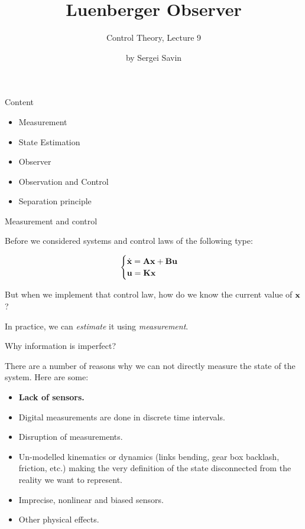 \documentclass{beamer}
\title{Luenberger Observer}
\subtitle{Control Theory, Lecture 9}
\author{by Sergei Savin}
\date{\mydate}
\begin{document}
\maketitle



\begin{frame}{Content}
\begin{itemize}
\item Measurement
\item State Estimation
\item Observer
\item Observation and Control
\item Separation principle
\end{itemize}
\end{frame}




\begin{frame}{Measurement and control}
\begin{flushleft}

Before we considered systems and control laws of the following type:

\begin{equation}
\begin{cases}
\dot {\mathbf{x}} = \mathbf{A} \mathbf{x} + \mathbf{B} \mathbf{u}\\
\mathbf{u} = \mathbf{K} \mathbf{x}
\end{cases}
\end{equation}

But when we implement that control law, how do we know the current value of $\mathbf{x}$?

\bigskip

In practice, we can \emph{estimate} it using \emph{measurement}.

\end{flushleft}
\end{frame}

\begin{frame}{Why information is imperfect?}
\begin{flushleft}

There are a number of reasons why we can not directly measure the state of the system. Here are some:

\begin{itemize}
\item \textbf{Lack of sensors.}
\item Digital measurements are done in discrete time intervals.
\item Disruption of measurements.
\item Un-modelled kinematics or dynamics (links bending, gear box backlash, friction, etc.) making the very definition of the state disconnected from the reality we want to represent.
\item Imprecise, nonlinear and biased sensors.
\item Other physical effects.
\end{itemize}

\end{flushleft}
\end{frame}
\end{document}
